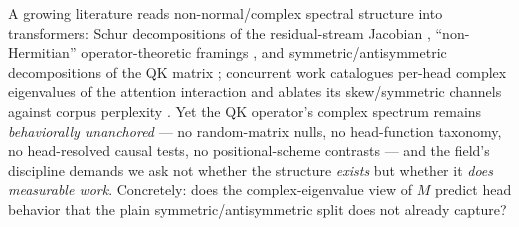 \documentclass[11pt]{article}
\newcommand{\M}{\ensuremath{M}\xspace}
\begin{document}
A growing literature reads non-normal/complex spectral structure into transformers: Schur decompositions of the
residual-stream Jacobian \citep{fernando2026dynamics}, ``non-Hermitian'' operator-theoretic framings
\citep{chang2026dyson}, and symmetric/antisymmetric decompositions of the QK matrix \citep{saponati2025}; concurrent
work catalogues per-head complex eigenvalues of the attention interaction and ablates its skew/symmetric channels
against corpus perplexity \citep{jamil2026routing}. Yet the QK
operator's complex spectrum remains \emph{behaviorally unanchored} --- no random-matrix nulls, no head-function
taxonomy, no head-resolved causal tests, no positional-scheme contrasts --- and the field's discipline demands we ask
not whether the structure \emph{exists} but whether it \emph{does measurable work}. Concretely: does the
complex-eigenvalue view of \M predict head behavior that the plain symmetric/antisymmetric split does not already
capture?
\end{document}
